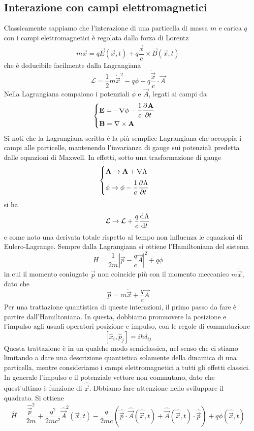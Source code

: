 \documentclass[a4paper, 11pt]{article}
\newcommand{\op}[1]{\hat{#1}}
\renewcommand{\op}[1]{\hat{#1}}
\newcommand{\ham}{\hat{H}}
\begin{document}
\subsection{Interazione con campi elettromagnetici}
Classicamente sappiamo che l'interazione di una particella di massa $m$ e carica $q$ con i campi elettromagnetici è regolata dalla forza di Lorentz
\[m\ddot{\vec{x}}=q\vec{E}(\vec{x},t)+q\frac{\dot{\vec{x}}}{c}\times\vec{B}(\vec{x},t)\]
che è deducibile facilmente dalla Lagrangiana
\[\mathcal{L}=\frac{1}{2}m\dot{\vec{x}}^2-q\phi+q\frac{\dot{\vec{x}}}{c}\cdot{\vec A}\]
Nella Lagrangiana compaiono i potenziali $\phi$ e $\vec{A}$, legati ai campi da
\[\begin{cases}
\vec{E}=-\nabla\phi-\dfrac{1}{c}\pder{\vec{A}}{t}\\[5pt]
\vec{B}=\nabla\times\vec{A}
\end{cases}\]
Si noti che la Lagrangiana scritta è la più semplice Lagrangiana che accoppia i campi alle particelle, mantenendo l'invarianza di gauge sui potenziali predetta dalle equazioni di Maxwell. In effetti, sotto una trasformazione di gauge
\[\begin{cases}
\vec{A}\to\vec{A}+\nabla\Lambda\\[5pt]
\phi\to\phi-\dfrac{1}{c}\pder{\Lambda}{t}
\end{cases}\]
si ha
\[\mathcal{L}\to\mathcal{L}+\frac{q}{c}\dfrac{\mathrm{d} ^{}\Lambda}{\mathrm{d} {t}^{}}\]
e come noto una derivata totale rispetto al tempo non influenza le equazioni di Eulero-Lagrange. Sempre dalla Lagrangiana si ottiene l'Hamiltoniana del sistema
\[H=\frac{1}{2m}\left|\vec{p}-\frac{q}{c}\vec{A}\right|^2+q\phi\]
in cui il momento coniugato $\vec{p}$ non coincide più con il momento meccanico $m\dot{\vec{x}}$, dato che
\[\vec{p}=m\dot{\vec{x}}+\frac{q}{c}\vec{A}\]
Per una trattazione quantistica di queste interazioni, il primo passo da fare è partire dall'Hamiltoniana. In questa, dobbiamo promuovere la posizione e l'impulso agli usuali operatori posizione e impulso, con le regole di commutazione
\[[\op{x}_i,\op{p}_j]=i\hbar\delta_{ij}\]
Questa trattazione è in un qualche modo semiclassica, nel senso che ci stiamo limitando a dare una descrizione quantistica solamente della dinamica di una particella, mentre consideriamo i campi elettromagnetici a tutti gli effetti classici.
In generale l'impulso e il potenziale vettore non commutano, dato che quest'ultimo è funzione di $\op{\vec{x}}$. Dbbiamo fare attenzione nello sviluppare il quadrato. Si ottiene
\[\ham=\frac{\op{\vec{p}}^2}{2m}+\frac{q^2}{2mc^2}\op{\vec{A}}^2(\vec{x},t)-\frac{q}{2mc}\left(\op{\vec{p}}\cdot\op{\vec{A}}(\op{\vec{x}},t)+\op{\vec{A}}(\op{\vec{x}},t)\cdot\op{\vec{p}}\right)+q\phi(\op{\vec{x}},t)\]
\end{document}

